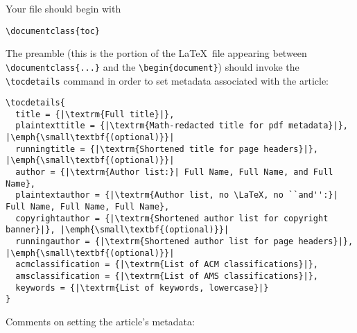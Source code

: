 \documentclass{article}
\theoremstyle{plain}
\theoremstyle{definition}
\begin{document}
 Your file should begin with
\begin{lstlisting}
\documentclass{toc}
\end{lstlisting}
The preamble (this is the portion of the \LaTeX\ file appearing between \lstinline`\documentclass{...}` and 
the \lstinline`\begin{document}`) should invoke the \lstinline`\tocdetails` command in order to set metadata associated with the article:
\begin{lstlisting}
\tocdetails{
  title = {|\textrm{Full title}|},
  plaintexttitle = {|\textrm{Math-redacted title for pdf metadata}|}, |\emph{\small\textbf{(optional)}}|
  runningtitle = {|\textrm{Shortened title for page headers}|}, |\emph{\small\textbf{(optional)}}|
  author = {|\textrm{Author list:}| Full Name, Full Name, and Full Name},
  plaintextauthor = {|\textrm{Author list, no \LaTeX, no ``and'':}| Full Name, Full Name, Full Name},
  copyrightauthor = {|\textrm{Shortened author list for copyright banner}|}, |\emph{\small\textbf{(optional)}}|
  runningauthor = {|\textrm{Shortened author list for page headers}|}, |\emph{\small\textbf{(optional)}}|
  acmclassification = {|\textrm{List of ACM classifications}|},
  amsclassification = {|\textrm{List of AMS classifications}|},
  keywords = {|\textrm{List of keywords, lowercase}|}
}
\end{lstlisting}
Comments on setting the article's metadata:
\end{document}
